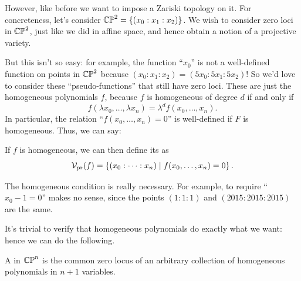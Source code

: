 However, like before we want to impose a Zariski topology on it.
For concreteness, let's consider $\mathbb{CP}^2 = \left\{ (x_0 : x_1 : x_2) \right\}$.
We wish to consider zero loci in $\mathbb{CP}^2$, just like we did in affine space,
and hence obtain a notion of a projective variety.

But this isn't so easy: for example,
the function ``$x_0$'' is not a well-defined function on points in $\mathbb{CP}^2$ 
because $(x_0 : x_1 : x_2) = (5x_0 : 5x_1 : 5x_2)$!
So we'd love to consider these ``pseudo-functions''
that still have zero loci. These are just the homogeneous polynomials $f$,
because $f$ is homogeneous of degree $d$ if and only if
\[
	f(\lambda x_0, \dots, \lambda x_n)
	= \lambda^d f(x_0, \dots, x_n).
\]
In particular, the relation ``$f(x_0, \dots, x_n) = 0$'' is
well-defined if $F$ is homogeneous. Thus, we can say:
\begin{definition}
	If $f$ is homogeneous, we can then define its  as
	\[
		\mathcal V_{\text{pr}}(f)
		= \left\{ (x_0 : \dots : x_n) \mid f(x_0, \dots, x_n) = 0 \right\}.
	\]
\end{definition}

The homogeneous condition is really necessary.
For example, to require ``$x_0 - 1 = 0$'' makes no sense,
since the points $(1:1:1)$ and $(2015:2015:2015)$ are the same.

It's trivial to verify that homogeneous polynomials do exactly what we want:
hence we can do the following.
\begin{definition}
	A  in $\mathbb{CP}^n$
	is the common zero locus of an arbitrary
	collection of homogeneous polynomials in $n+1$ variables.
\end{definition}

